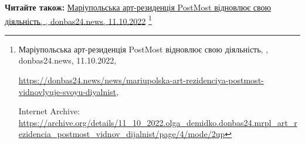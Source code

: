  
 
 
 
 

\def\pubIA{https://archive.org/details/11_10_2022.olga_demidko.donbas24.mrpl_art_rezidencia_postmost_vidnov_dijalnist/page/4/mode/2up}
\def\pubTitle{Маріупольська арт-резиденція PostMost відновлює свою діяльність}
\def\pubDate{11.10.2022}
\def\pubOrigin{https://donbas24.news/news/mariupolska-art-rezidenciya-postmost-vidnovlyuje-svoyu-diyalnist}
\def\pubAuthor{\pubAuthorDemidko}
\def\pubSite{donbas24.news}

\textbf{Читайте також:} \href{\pubIA}{%
\pubTitle, \pubAuthor, \pubSite, \pubDate}%
\footnote{\pubTitle, \pubAuthor, \pubSite, \pubDate, \par\url{\pubOrigin}, \par Internet Archive: \url{\pubIA}}
